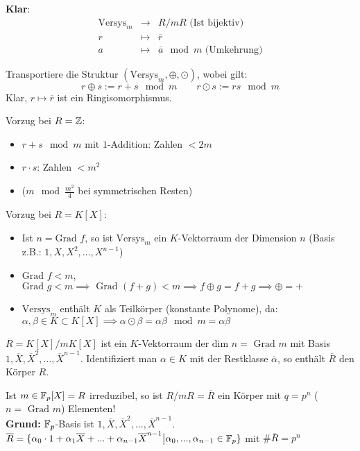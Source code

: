 \documentclass[a4paper,DIV15,BCOR12mm]{article}
\begin{document}
\textbf{Klar}:
\[\begin{array}{rcl}
        \text{Versys}_m & \longrightarrow & R/mR \text{ (Ist bijektiv)}\\
        r & \longmapsto & \overline r\\
        a & \longmapsto & \overline a \mod m \text{ (Umkehrung)}
    \end{array}
\]

Transportiere die Struktur $(\text{Versys}_m, \oplus, \odot)$, wobei
gilt:
\[
    r \oplus s := r+s \mod m \qquad
    r \odot s := rs \mod m
\]
Klar, $r \mapsto \overline r$ ist ein Ringisomorphismus.

Vorzug bei $R = \mathbb{Z}$:
\begin{itemize}
    \item[] $r+s \mod m$ mit $1$-Addition: Zahlen $< 2m$
    \item[] $r\cdot s$: Zahlen $<m^2$
    \item[] ($m \mod \frac{m^2}{4}$ bei symmetrischen Resten)
\end{itemize}

Vorzug bei $R = K[X]$:
\begin{itemize}
    \item[] Ist $n = \text{Grad }f$, so ist $\text{Versys}_m$ ein $K$-Vektorraum der Dimension $n$ (Basis z.B.: $1, X, X^2, ..., X^{n-1}$)
    \item[] $\text{Grad }f < m$, $\text{Grad }g < m \implies \text{ Grad } (f+g) < m \implies f \oplus g = f + g \implies \oplus = +$
    \item[] $\text{Versys}_m$ enthält $K$ als Teilkörper (konstante Polynome), da:\\
    $\alpha, \beta \in K \subset K[X] \implies \alpha \odot \beta = \alpha \beta \mod m = \alpha\beta$
\end{itemize}

\begin{folgerung}
    $\overline R = K[X]/mK[X]$ ist ein $K$-Vektorraum der $\text{dim }n = \text{ Grad }m$ mit Basis $1, \overline X, \overline X^2, ..., \overline X^{n-1}$. Identifiziert man $\alpha \in K$ mit der Restklasse $\overline \alpha$, so enthält $\overline R$ den Körper $R$.
\end{folgerung}

\begin{folgerung}
    Ist $m \in \mathbb{F}_p[X] = R$ irreduzibel, so ist $R/mR = \overline R$ ein Körper mit $q = p^n$ ($n = \text{ Grad }m$) Elementen!\\
    \textbf{Grund:} $\mathbb{F}_p$-Basis ist $1, \overline X, \overline X^2, ... , \overline X^{n-1}$.\\
    $\overline R = \{\alpha_0 \cdot 1 + \alpha_1 \overline X +... + \alpha_{n-1} \overline X^{n-1} \big| \alpha_0,...,\alpha_{n-1} \in \mathbb{F}_p\}$ mit $\# \overline R = p^n$
\end{folgerung}
\end{document}
